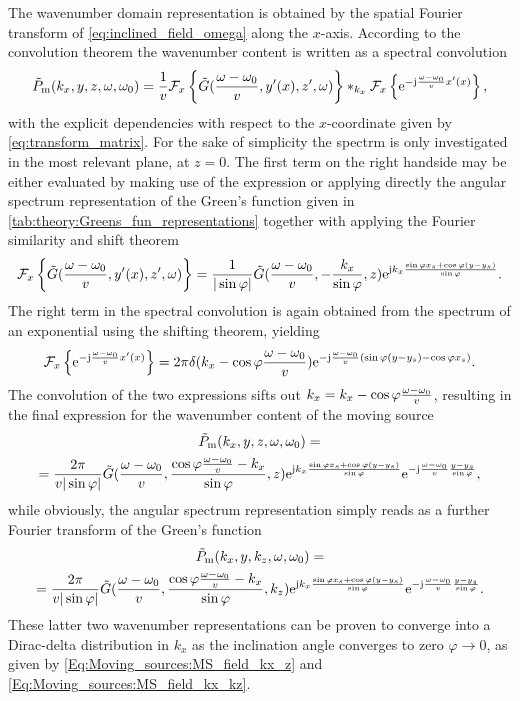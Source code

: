 The wavenumber domain representation is obtained by the spatial Fourier transform of \eqref{eq:inclined_field_omega} along the $x$-axis.
According to the convolution theorem the wavenumber content is written as a spectral convolution
\begin{equation}
\tilde{P}_{\mathrm{m}}(k_x,y,z,\omega,\omega_0) =
\frac{1}{v}
\mathcal{F}_x \left\{
\tilde{G}(\frac{\omega-\omega_0}{v}, y'(x), z', \omega) \right\}
\ast_{k_x}
\mathcal{F}_x \left\{
\mathrm{e}^{-\mathrm{j} \frac{\omega-\omega_0}{v} x'(x)}
 \right\},
\end{equation}
with the explicit dependencies with respect to the $x$-coordinate given by \eqref{eq:transform_matrix}.
For the sake of simplicity the spectrm is only investigated in the most relevant plane, at $z = 0$.
The first term on the right handside may be either evaluated by making use of the expression \cite[(6.677,9.)]{Gradshteyn2007} or applying directly the angular spectrum representation of the Green's function given in \eqref{tab:theory:Greens_fun_representations} together with applying the Fourier similarity and shift theorem
\begin{equation}
\mathcal{F}_x \left\{
\tilde{G}(\frac{\omega-\omega_0}{v}, y'(x), z', \omega) \right\} =
\frac{1}{|\sin\varphi|} \tilde{G}( \frac{\omega-\omega_0}{v}, - \frac{k_x}{\sin\varphi} , z ) \mathrm{e}^{\mathrm{j} k_x \frac{\sin\varphi x_s + \cos\varphi (y-y_s)}{\sin\varphi}}.
\end{equation}
The right term in the spectral convolution is again obtained from the spectrum of an exponential using the shifting theorem, yielding
\begin{equation}
\mathcal{F}_x \left\{
\mathrm{e}^{-\mathrm{j} \frac{\omega-\omega_0}{v} x'(x)}
 \right\} = 2\pi \delta(k_x - \cos\varphi \frac{\omega-\omega_0}{v}) \mathrm{e}^{-\mathrm{j} \frac{\omega-\omega_0}{v}\left( \sin\varphi(y-y_s) - \cos\varphi x_s \right)}.
\end{equation}
The convolution of the two expressions sifts out $k_x = k_x - \cos\varphi \frac{\omega-\omega_0}{v}$, resulting in the final expression for the wavenumber content of the moving source
\begin{multline}
\tilde{P}_{\mathrm{m}}(k_x,y,z,\omega,\omega_0) = \\ =
\frac{2\pi}{v|\sin\varphi|} \tilde{G}( \frac{\omega-\omega_0}{v}, \frac{\cos\varphi \frac{\omega-\omega_0}{v}- k_x }{\sin\varphi} , z )  
\mathrm{e}^{\mathrm{j} k_x\frac{\sin\varphi x_s + \cos\varphi (y-y_s)}{\sin\varphi}}
\mathrm{e}^{-\mathrm{j} \frac{\omega-\omega_0}{v} \frac{y-y_s}{\sin\varphi}},
\end{multline}
while obviously, the angular spectrum representation simply reads as a further Fourier transform of the Green's function
\begin{multline}
\tilde{P}_{\mathrm{m}}(k_x,y,k_z,\omega,\omega_0) = \\ =
\frac{2\pi}{v|\sin\varphi|} \tilde{G}( \frac{\omega-\omega_0}{v}, \frac{\cos\varphi \frac{\omega-\omega_0}{v}- k_x }{\sin\varphi} , k_z )  
\mathrm{e}^{\mathrm{j} k_x\frac{\sin\varphi x_s + \cos\varphi (y-y_s)}{\sin\varphi}}
\mathrm{e}^{-\mathrm{j} \frac{\omega-\omega_0}{v} \frac{y-y_s}{\sin\varphi}}.
\end{multline}
These latter two wavenumber representations can be proven to converge into a Dirac-delta distribution in $k_x$ as the inclination angle converges to zero $\varphi \rightarrow 0$, as given by \eqref{Eq:Moving_sources:MS_field_kx_z} and \eqref{Eq:Moving_sources:MS_field_kx_kz}.